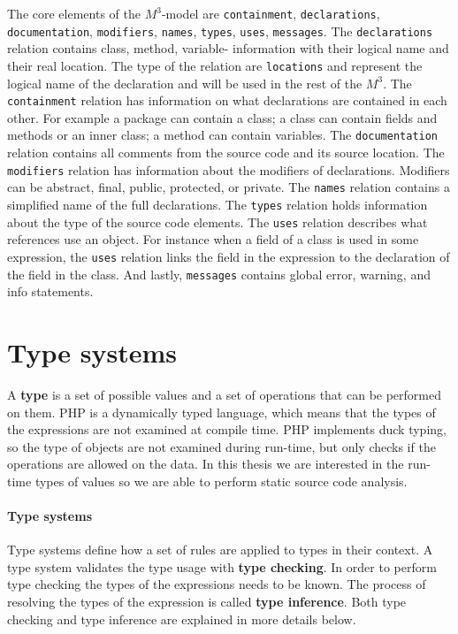 \documentclass[../main.tex]{subfiles}
\begin{document}
    The core elements of the $M^3$-model are \texttt{containment}, \texttt{declarations}, \texttt{documentation}, \texttt{modifiers}, \texttt{names}, \texttt{types}, \texttt{uses}, \texttt{messages}.
    The \texttt{declarations} relation contains class, method, variable- information with their logical name and their real location. The type of the relation are \texttt{locations} and represent the logical name of the declaration and will be used in the rest of the $M^3$.
    The \texttt{containment} relation has information on what declarations are contained in each other. For example a package can contain a class; a class can contain fields and methods or an inner class; a method can contain variables.    
    The \texttt{documentation} relation contains all comments from the source code and its source location.
    The \texttt{modifiers} relation has information about the modifiers of declarations. Modifiers can be abstract, final, public, protected, or private.
    The \texttt{names} relation contains a simplified name of the full declarations.
    The \texttt{types} relation holds information about the type of the source code elements.
    The \texttt{uses} relation describes what references use an object. For instance when a field of a class is used in some expression, the \texttt{uses} relation links the field in the expression to the declaration of the field in the class.
    And lastly, \texttt{messages} contains global error, warning, and info statements.
    
    
    \section{Type systems}\label{sec:background_type-system}
    A \textbf{type} is a set of possible values and a set of operations that can be performed on them.
    PHP is a dynamically typed language, which means that the types of the expressions are not examined at compile time.
    PHP implements duck typing, so the type of objects are not examined during run-time, but only checks if the operations are allowed on the data.
    In this thesis we are interested in the run-time types of values so we are able to perform static source code analysis.
   
    \paragraph{Type systems} Type systems define how a set of rules are applied to types in their context.
    A type system validates the type usage with \textbf{type checking}.
    In order to perform type checking the types of the expressions needs to be known.
    The process of resolving the types of the expression is called \textbf{type inference}.
    Both type checking and type inference are explained in more details below.
    
\end{document}
